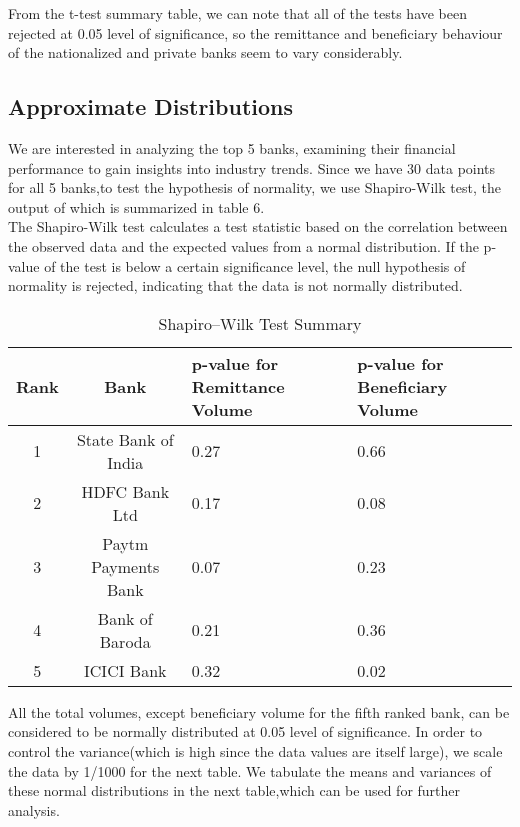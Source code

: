 \documentclass{article}
\begin{document}
From the t-test summary table, we can note that all of the tests have been rejected at 0.05 level of significance, so the remittance and beneficiary behaviour of the nationalized and private banks seem to vary considerably.

\newpage
\subsection{Approximate Distributions}

We are interested in analyzing the top 5 banks, examining their financial performance to gain insights into industry trends. Since we have 30 data points for all 5 banks,to test the hypothesis of normality, we use Shapiro-Wilk test, the output of which is summarized in table 6.
\\
	The Shapiro-Wilk test calculates a test statistic based on the correlation between the observed data and the expected values from a normal distribution. If the p-value of the test is below a certain significance level, the null hypothesis of normality is rejected, indicating that the data is not normally distributed.

\begin{table}[h]
    \centering 
\caption{Shapiro–Wilk Test Summary}
    \begin{tabular}{|c|c|p{4cm}|p{4cm}|}
        \hline
        \textbf{Rank} & \textbf{Bank} & \textbf{p-value for Remittance Volume} & \textbf{p-value for Beneficiary Volume} \\
        \hline
        1 & State Bank of India & 0.27 & 0.66 \\
        2 & HDFC Bank Ltd & 0.17 & 0.08 \\
        3 & Paytm Payments Bank & 0.07 & 0.23 \\
        4 & Bank of Baroda & 0.21 & 0.36 \\
        5 & ICICI Bank & 0.32 & 0.02 \\
        \hline
    \end{tabular}
\end{table}

All the total volumes, except beneficiary volume for the fifth ranked bank, can be considered to be normally distributed at 0.05 level of significance. In order to control the variance(which is high since the data values are itself large), we scale the data by 1/1000 for the next table.
We tabulate the means and variances of these normal distributions in the next table,which can be used for further analysis.
\end{document}

